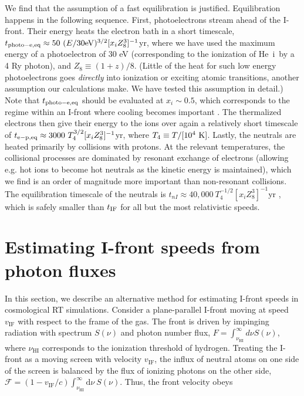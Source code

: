 \documentclass[twocolumn]{aastex62}
\newcommand{\HeI}{He{\sc~i}}
\newcommand{\vIF}{v_{\mathrm{IF}}}
\begin{document}
\begin{appendix}
We find that the assumption of a fast equilibration is justified.  Equilibration happens in the following sequence.  First, photoelectrons stream ahead of the I-front.  Their energy heats the electron bath in a short timescale, $t_{\rm photo-e, eq} \approx 50 ~(E/30\mathrm{eV})^{3/2} [x_i  Z_8^3]^{-1}$yr, where we have used the maximum energy of a photoelectron of $30$ eV (corresponding to the ionization of \HeI\ by a 4 Ry photon), and $Z_8 \equiv (1+ z)/8$.  (Little of the heat for such low energy photoelectrons goes {\it directly} into ionization or exciting atomic transitions, another assumption our calculations make.  We have tested this assumption in detail.)  Note that $t_{\rm photo-e, eq}$ should be evaluated at $x_i\sim 0.5$, which corresponds to the regime within an I-front where cooling becomes important \citep{2010MNRAS.404.1869F}.  The thermalized electrons then give their energy to the ions over again a relatively short timescale of $t_{\rm e-p, eq} \approx 3000~T_4^{3/2} [x_i  Z_8^3]^{-1}$yr, where $T_4 \equiv T/[10^4~{\rm K}]$.  Lastly, the neutrals are heated primarily by collisions with protons.  At the relevant temperatures, the collisional processes are dominated by resonant exchange of electrons (allowing e.g. hot ions to become hot neutrals as the kinetic energy is maintained), which we find is an order of magnitude more important than non-resonant collisions.  The equilibration timescale of the neutrals is $t_{nI} \approx 40,000 ~ T_4^{-1/2} [x_i  Z_8^3]^{-1}$yr \citep{1962JChPh..37.2631R, 1966P&amp;SS...14.1105B}, which is safely smaller than $t_{\rm IF}$ for all but the most relativistic speeds. 

\section{Estimating I-front speeds from photon fluxes}
\label{sec:fluxspeeds}

In this section, we describe an alternative method for estimating I-front speeds in cosmological RT simulations. Consider a plane-parallel I-front moving at speed $\vIF$ with respect to the frame of the gas.  The front is driven by impinging radiation with spectrum $S(\nu)$ and photon number flux, $F=\int_{\nu_{\mathrm{HI}}}^{\infty} d \nu S(\nu)$, where $\nu_{\mathrm{HI}}$ corresponds to the ionization threshold of hydrogen.  { Treating the I-front as a moving screen with velocity $\vIF$, the influx of neutral atoms on one side of the screen is balanced by the flux of ionizing photons on the other side}, $\mathcal{F} = (1-\vIF/c) \int_{\nu_{\mathrm{HI}}}^{\infty} \mathrm{d} \nu ~S(\nu)$.  Thus, the front velocity obeys {\citep{1994MNRAS.266..343M, 2006ApJ...648..922S}}


\end{appendix}
\end{document}
